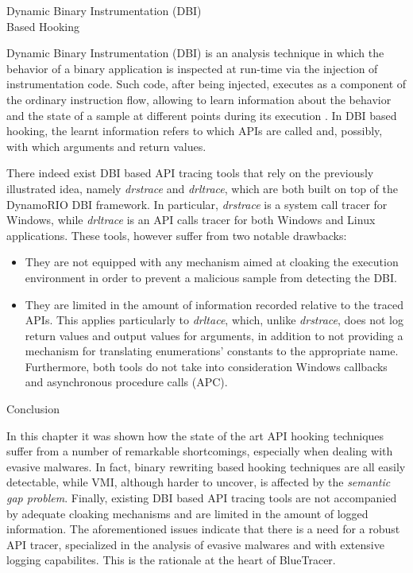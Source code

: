 \documentclass[binding=0.6cm,LaM,english,noexaminfo,oneside]{sapthesis} %
\begin{document}
\begin{section}{Dynamic Binary Instrumentation (DBI) \\
Based Hooking}

Dynamic Binary Instrumentation (DBI) is an analysis technique in which the behavior of a binary application is inspected at run-time via the injection of instrumentation code. Such code, after being injected, executes as a component of the ordinary instruction flow, allowing to learn information about the behavior and the state of a sample at different points during its execution \cite{DBI}. In DBI based hooking, the learnt information refers to which APIs are called and, possibly, with which arguments and return values. 

There indeed exist DBI based API tracing tools that rely on the previously illustrated idea, namely \textit{drstrace} and \textit{drltrace}, which are both built on top of the DynamoRIO \cite{DynamoRIO} DBI framework. In particular, \textit{drstrace} is a system call tracer for Windows, while \textit{drltrace} is an API calls tracer for both Windows and Linux applications. These tools, however suffer from two notable drawbacks:

\begin{itemize}
\item They are not equipped with any mechanism aimed at cloaking the execution environment in order to prevent a malicious sample from detecting the DBI.
\item They are limited in the amount of information recorded relative to the traced APIs. This applies particularly to \textit{drltace}, which, unlike \textit{drstrace}, does not log return values and output values for arguments, in addition to not providing a mechanism for translating enumerations' constants to the appropriate name. Furthermore, both tools do not take into consideration Windows callbacks and asynchronous procedure calls (APC).
\end{itemize}

\end{section}

\begin{section}{Conclusion}

In this chapter it was shown how the state of the art API hooking techniques suffer from a number of remarkable shortcomings, especially when dealing with evasive malwares. In fact, binary rewriting based hooking techniques are all easily detectable, while VMI, although harder to uncover, is affected by the \textit{semantic gap problem}. Finally, existing DBI based API tracing tools are not accompanied by adequate cloaking mechanisms and are limited in the amount of logged information. The aforementioned issues indicate that there is a need for a robust API tracer, specialized in the analysis of evasive malwares and with extensive logging capabilites. This is the rationale at the heart of BlueTracer. 

\end{section}
\end{document}
